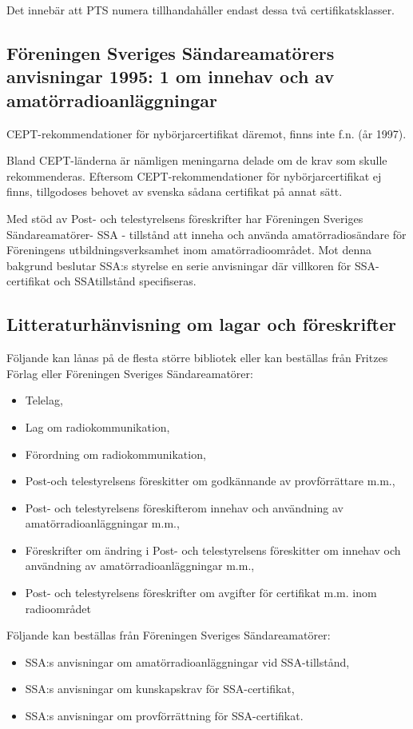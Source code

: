 Det innebär att PTS numera tillhandahåller endast dessa två
certifikatsklasser.

\subsection{Föreningen Sveriges Sändareamatörers anvisningar
1995: 1 om innehav och av amatörradioanläggningar}

CEPT-rekommendationer för nybörjarcertifikat däremot, finns inte
f.n. (år 1997).

Bland CEPT-länderna är nämligen meningarna delade om de krav som
skulle rekommenderas. Eftersom CEPT-rekommendationer för
nybörjarcertifikat ej finns, tillgodoses behovet av svenska sådana
certifikat på annat sätt.

Med stöd av Post- och telestyrelsens föreskrifter har Föreningen
Sveriges Sändareamatörer- SSA - tillstånd att inneha och använda
amatörradiosändare för Föreningens utbildningsverksamhet inom
amatörradioområdet. Mot denna bakgrund beslutar SSA:s styrelse en serie
anvisningar där villkoren för SSA-certifikat och SSAtillstånd
specifiseras.

\subsection{Litteraturhänvisning om lagar och föreskrifter}

Följande kan lånas på de flesta större bibliotek eller kan beställas
från Fritzes Förlag eller Föreningen Sveriges Sändareamatörer:
\begin{itemize}
\item Telelag,
\item Lag om radiokommunikation,
\item Förordning om radiokommunikation,
\item Post-och telestyrelsens föreskitter om godkännande av
  provförrättare m.m.,
\item Post- och telestyrelsens föreskifterom innehav och användning av
  amatörradioanläggningar m.m.,
\item Föreskrifter om ändring i Post- och telestyrelsens föreskitter
  om innehav och användning av amatörradioanläggningar m.m.,
\item Post- och telestyrelsens föreskrifter om avgifter för certifikat
  m.m. inom radioområdet
\end{itemize}

Följande kan beställas från Föreningen Sveriges Sändareamatörer:
\begin{itemize}
\item SSA:s anvisningar om amatörradioanläggningar vid SSA-tillstånd,
\item SSA:s anvisningar om kunskapskrav för SSA-certifikat,
\item SSA:s anvisningar om provförrättning för SSA-certifikat.
\end{itemize}
